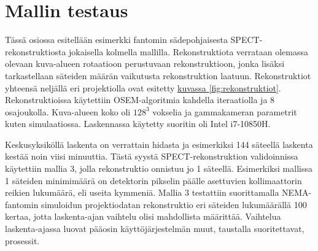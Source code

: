 \section{Mallin testaus}
Tässä osiossa esitellään esimerkki fantomin sädepohjaisesta SPECT-rekonstruktiosta jokaisella kolmella mallilla. Rekonstruktiota verrataan olemassa olevaan kuva-alueen rotaatioon perustuvaan rekonstruktioon, jonka lisäksi tarkastellaan säteiden määrän vaikutusta rekonstruktion laatuun. Rekonstruktiot yhteensä neljällä eri projektiolla ovat esitetty \hyperref[fig:rekonstruktiot]{kuvassa \ref*{fig:rekonstruktiot}}. Rekonstruktioissa käytettiin OSEM-algoritmia kahdella iteraatiolla ja 8 osajoukolla. Kuva-alueen koko oli $128^3$ vokselia ja gammakameran parametrit kuten simulaatiossa. Laskennassa käytetty suoritin oli Intel i7-10850H.

Keskusyksiköllä laskenta on verrattain hidasta ja esimerkiksi 144 säteellä laskenta kestää noin viisi minuuttia. Tästä syystä SPECT-rekonstruktion validoinnissa käytettiin mallia 3, jolla rekonstruktio onnistuu jo 1 säteellä. Esimerkiksi mallissa 1 säteiden minimimäärä on detektorin pikselin päälle asettuvien kollimaattorin reikien lukumäärä, eli useita kymmeniä. Mallia 3 testattiin suorittamalla NEMA-fantomin simuloidun projektiodatan rekonstruktio eri säteiden lukumäärällä 100 kertaa, jotta laskenta-ajan vaihtelu olisi mahdollista määrittää. Vaihtelua laskenta-ajassa luovat pääosin käyttöjärjestelmän muut, taustalla suoritettavat, prosessit.

